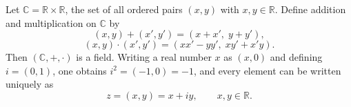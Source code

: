 Let $\mathbb{C} = \mathbb{R} \times \mathbb{R}$, the set of all ordered pairs $(x, y)$ with $x, y \in \mathbb{R}$.
Define addition and multiplication on $\mathbb{C}$ by
$$
(x, y) + (x', y') = (x + x',\; y + y'),
$$
$$
(x, y) \cdot (x', y') = (xx' - yy',\; xy' + x'y).
$$
Then $(\mathbb{C}, +, \cdot)$ is a field. Writing a real number $x$ as $(x, 0)$ and defining $i = (0, 1)$, one obtains $i^2 = (-1, 0) = -1$, and every element can be written uniquely as
$$
z = (x, y) = x + iy, \qquad x, y \in \mathbb{R}.
$$
